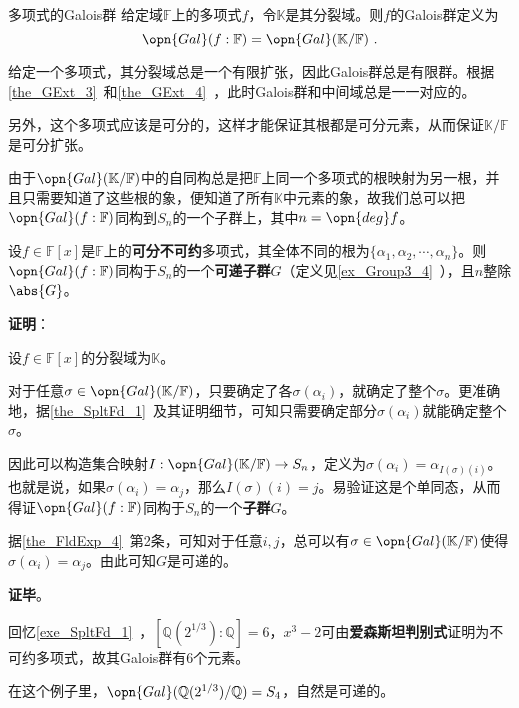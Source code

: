 \begin{definition}{多项式的Galois群}
给定域$\mathbb{F}$上的多项式$f$，令$\mathbb{K}$是其分裂域。则$f$的Galois群定义为
\begin{equation}
\opn{Gal}(f:\mathbb{F})=\opn{Gal}(\mathbb{K}/\mathbb{F})~.
\end{equation}
\end{definition}

给定一个多项式，其分裂域总是一个有限扩张，因此Galois群总是有限群。根据\autoref{the_GExt_3}~和\autoref{the_GExt_4}~，此时Galois群和中间域总是一一对应的。

另外，这个多项式应该是可分的，这样才能保证其根都是可分元素，从而保证$\mathbb{K}/\mathbb{F}$是可分扩张。

由于$\opn{Gal}(\mathbb{K}/\mathbb{F})$中的自同构总是把$\mathbb{F}$上同一个多项式的根映射为另一根，并且只需要知道了这些根的象，便知道了所有$\mathbb{K}$中元素的象，故我们总可以把$\opn{Gal}(f:\mathbb{F})$同构到$S_n$的一个子群上，其中$n=\opn{deg}f$。

\begin{theorem}{}\label{the_PlyRtS_1}
设$f\in\mathbb{F}[x]$是$\mathbb{F}$上的\textbf{可分不可约}多项式，其全体不同的根为$\{\alpha_1, \alpha_2, \cdots, \alpha_n\}$。则$\opn{Gal}(f:\mathbb{F})$同构于$S_n$的一个\textbf{可递子群}$G$（定义见\autoref{ex_Group3_4}~），且$n$整除$\abs{G}$。
\end{theorem}

\textbf{证明}：

设$f\in\mathbb{F}[x]$的分裂域为$\mathbb{K}$。

对于任意$\sigma\in\opn{Gal}(\mathbb{K}/\mathbb{F})$，只要确定了各$\sigma(\alpha_i)$，就确定了整个$\sigma$。更准确地，据\autoref{the_SpltFd_1}~及其证明细节，可知只需要确定部分$\sigma(\alpha_i)$就能确定整个$\sigma$。

因此可以构造集合映射$I:\opn{Gal}(\mathbb{K}/\mathbb{F})\to S_n$，定义为$\sigma(\alpha_i)=\alpha_{I(\sigma)(i)}$。也就是说，如果$\sigma(\alpha_i)=\alpha_j$，那么$I(\sigma)(i)=j$。易验证这是个单同态，从而得证$\opn{Gal}(f:\mathbb{F})$同构于$S_n$的一个\textbf{子群}$G$。

据\autoref{the_FldExp_4}~第2条，可知对于任意$i, j$，总可以有$\sigma\in\opn{Gal}(\mathbb{K}/\mathbb{F})$使得$\sigma(\alpha_i)=\alpha_j$。由此可知$G$是可递的。

\textbf{证毕}。


\begin{example}{}
回忆\autoref{exe_SpltFd_1}~，$[\mathbb{Q}(2^{1/3}):\mathbb{Q}]=6$，$x^3-2$可由\textbf{爱森斯坦判别式}证明为不可约多项式，故其Galois群有6个元素。

在这个例子里，$\opn{Gal}(\mathbb{Q}(2^{1/3})/\mathbb{Q})=S_4$，自然是可递的。
\end{example}

